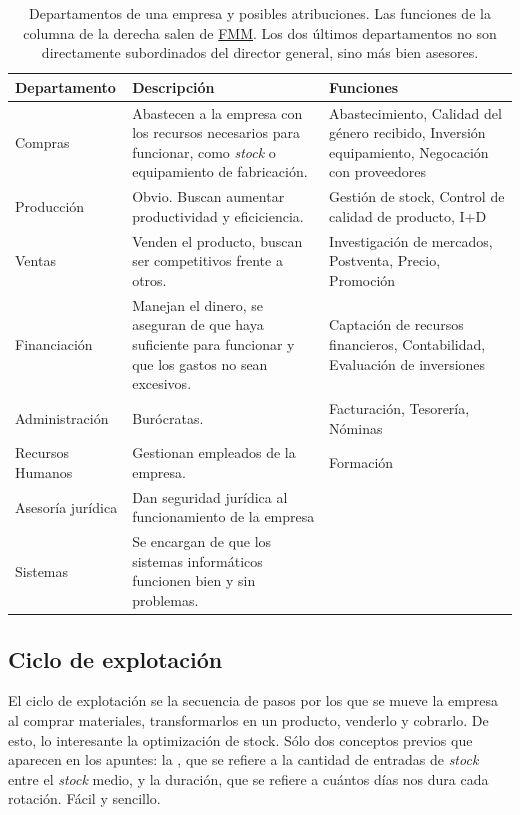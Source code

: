 \documentclass[nochap,palatino,shortheader]{apuntes}
\begin{document}
\begin{table}[hbtp]
\centering
\begin{tabular}{l|p{5cm}|p{5cm}}
\textbf{Departamento} & \textbf{Descripción} & \textbf{Funciones} \\ \toprule
Compras & Abastecen a la empresa con los recursos necesarios para funcionar, como \textit{stock} o equipamiento de fabricación. & Abastecimiento, Calidad del género recibido, Inversión equipamiento, Negocación con proveedores \\ \midrule

Producción & Obvio. Buscan aumentar productividad y eficiciencia. & Gestión de stock, Control de calidad de producto, I+D \\ \midrule

Ventas & Venden el producto, buscan ser competitivos frente a otros. & Investigación de mercados, Postventa, Precio, Promoción \\ \midrule

Financiación & Manejan el dinero, se aseguran de que haya suficiente para funcionar y que los gastos no sean excesivos. & Captación de recursos financieros, Contabilidad, Evaluación de inversiones \\ \midrule

Administración & Burócratas. & Facturación, Tesorería, Nóminas \\ \midrule

Recursos Humanos & Gestionan empleados de la empresa. & Formación\\ \midrule \midrule
Asesoría jurídica & Dan seguridad jurídica al funcionamiento de la empresa & \\ \midrule
Sistemas & Se encargan de que los sistemas informáticos funcionen bien y sin problemas. & \\
\end{tabular}
\caption{Departamentos de una empresa y posibles atribuciones. Las funciones de la columna de la derecha salen de \href{http://maestremiranda.com/techdir/wp-content/uploads/2015/10/Organizacion2.pdf}{FMM}. Los dos últimos departamentos no son directamente subordinados del director general, sino más bien asesores.}
\label{tab:Organizacion}
\end{table}

\subsection{Ciclo de explotación}

El ciclo de explotación se la secuencia de pasos por los que se mueve la empresa al comprar materiales, transformarlos en un producto, venderlo y cobrarlo. De esto, lo interesante la optimización de stock. Sólo dos conceptos previos que aparecen en los apuntes: la , que se refiere a la cantidad de entradas de \textit{stock} entre el \textit{stock} medio, y la duración, que se refiere a cuántos días nos dura cada rotación. Fácil y sencillo.
\end{document}
